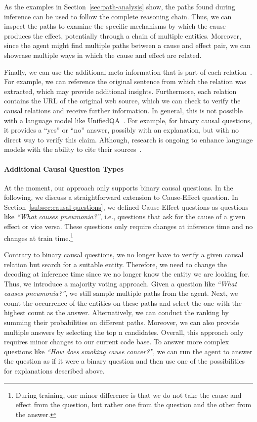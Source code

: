 As the examples in Section~\ref{sec:path-analysis} show, the paths found during 
inference can be used to follow the complete reasoning chain. Thus, we can inspect 
the paths to examine the specific mechanisms by which the cause produces the effect, potentially through a chain 
of multiple entities. Moreover, since the agent might find multiple paths between a cause and effect 
pair, we can showcase multiple ways in which the cause and effect are related.

Finally, we can use the additional meta-information that is part of each relation~\cite{Heindorf2020Causenet}.
For example, we can reference the original sentence from which the relation was extracted, which may provide additional insights. 
Furthermore, each relation contains the URL of the original web source, which we can check to verify the causal relations and receive further information.
In general, this is not possible with a language model like UnifiedQA~\cite{Khashabi2020UnifiedQA, Khashabi2022UnifiedQA2}. For example, for binary causal questions, 
it provides a ``yes'' or ``no'' answer, possibly with an explanation, but with no direct way to verify this claim.
Although, research is ongoing to enhance language models with the 
ability to cite their sources~\cite{Menick2022Cite}.


\paragraph{Additional Causal Question Types}
At the moment, our approach only supports binary causal questions. In the following, 
we discuss a straightforward extension to Cause-Effect question. In Section~\ref{subsec:causal-questions}, we defined
 Cause-Effect questions as questions like \textit{``What causes pneumonia?''}, i.e., questions that ask for the 
 cause of a given effect or vice versa. These questions only require changes at inference time and no changes at 
 train time.\footnote{During training, one minor difference is that we do not take the cause and effect from the question, but rather one from the question and the other from the answer.}

Contrary to binary causal questions, we no longer have to verify a given causal relation but search for a suitable entity.
Therefore, we need to change the decoding at inference time since we no longer know the entity we are looking for.
Thus, we introduce a majority voting approach. Given a question like \textit{``What causes pneumonia?''}, 
we still sample multiple paths from the agent. Next, we count the occurrence of the entities on these 
paths and select the one with the highest count as the answer. Alternatively, we can 
conduct the ranking by summing their probabilities on different paths. Moreover, we can also provide 
multiple answers by selecting the top n candidates.
Overall, this approach only requires minor changes to our current code base.
To answer more complex questions like \textit{``How does smoking cause cancer?''}, we can 
run the agent to answer the question as if it were a binary question and then use one of the possibilities for explanations described above.


